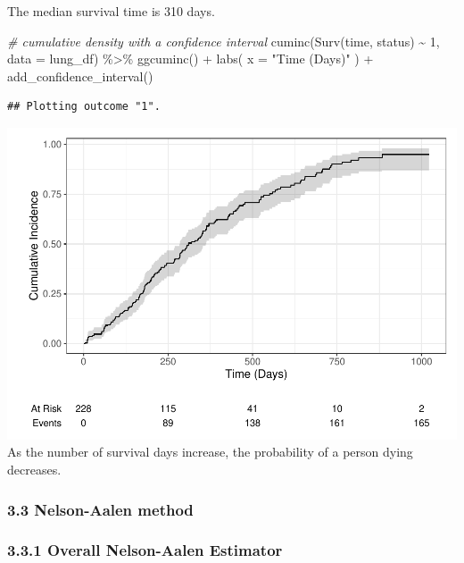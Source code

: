 \documentclass[
]{article}
\newenvironment{Shaded}{\begin{snugshade}}{\end{snugshade}}
\newcommand{\AttributeTok}[1]{\textcolor[rgb]{0.77,0.63,0.00}{#1}}
\newcommand{\CommentTok}[1]{\textcolor[rgb]{0.56,0.35,0.01}{\textit{#1}}}
\newcommand{\DecValTok}[1]{\textcolor[rgb]{0.00,0.00,0.81}{#1}}
\newcommand{\FunctionTok}[1]{\textcolor[rgb]{0.00,0.00,0.00}{#1}}
\newcommand{\NormalTok}[1]{#1}
\newcommand{\SpecialCharTok}[1]{\textcolor[rgb]{0.00,0.00,0.00}{#1}}
\newcommand{\StringTok}[1]{\textcolor[rgb]{0.31,0.60,0.02}{#1}}
\begin{document}
The median survival time is 310 days.

\begin{Shaded}
\begin{Highlighting}[]
\CommentTok{\# cumulative density with a confidence interval}
\FunctionTok{cuminc}\NormalTok{(}\FunctionTok{Surv}\NormalTok{(time, status) }\SpecialCharTok{\textasciitilde{}} \DecValTok{1}\NormalTok{, }\AttributeTok{data =}\NormalTok{ lung\_df) }\SpecialCharTok{\%\textgreater{}\%} 
  \FunctionTok{ggcuminc}\NormalTok{() }\SpecialCharTok{+} 
  \FunctionTok{labs}\NormalTok{(}
    \AttributeTok{x =} \StringTok{"Time (Days)"}
\NormalTok{  ) }\SpecialCharTok{+} 
  \FunctionTok{add\_confidence\_interval}\NormalTok{() }
\end{Highlighting}
\end{Shaded}

\begin{verbatim}
## Plotting outcome "1".
\end{verbatim}

\includegraphics{final_project_files/figure-latex/unnamed-chunk-11-1.pdf}
As the number of survival days increase, the probability of a person
dying decreases.

\hypertarget{nelson-aalen-method}{%
\subsubsection{3.3 Nelson-Aalen method}\label{nelson-aalen-method}}

\hypertarget{overall-nelson-aalen-estimator}{%
\subsubsection{3.3.1 Overall Nelson-Aalen
Estimator}\label{overall-nelson-aalen-estimator}}
\end{document}
